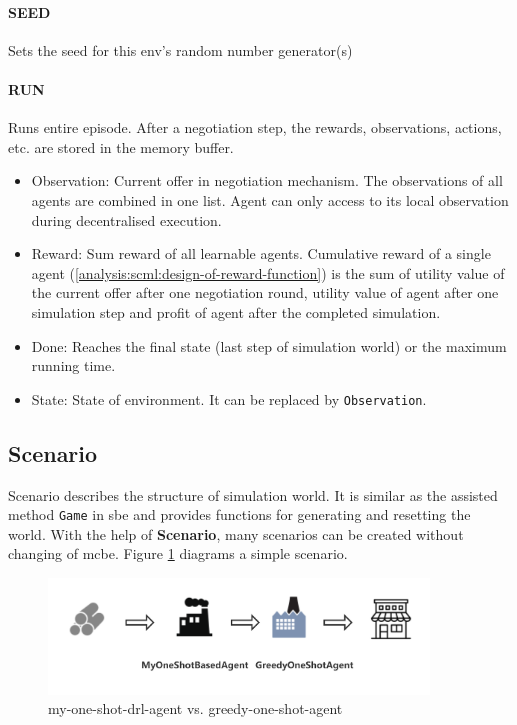 \paragraph{SEED} Sets the seed for this env’s random number generator(s)
\paragraph{RUN} Runs entire episode. After a negotiation step, the rewards, observations, actions, etc. are stored in the memory buffer. 
\begin{itemize}
	\item Observation: Current offer in negotiation mechanism. The observations of all agents are combined in one list. Agent can only access to its local observation during decentralised execution.
	\item Reward: Sum reward of all learnable agents. Cumulative reward of a single agent (\ref{analysis:scml:design-of-reward-function}) is the sum of utility value of the current offer after one negotiation round, utility value of agent after one simulation step and profit of agent after the completed simulation.
	\item Done: Reaches the final state (last step of simulation world) or the maximum running time.
	\item State: State of environment. It can be replaced by \texttt{Observation}.
\end{itemize}

\subsection{Scenario} \label{scenario}
Scenario describes the structure of simulation world. It is similar as the assisted method \texttt{Game} in \gls{sbe} and provides functions for generating and resetting the world. With the help of \textbf{Scenario}, many scenarios can be created without changing of \gls{mcbe}. Figure \ref{fig:supply-chain-scenario-1} diagrams a simple scenario.

\begin{figure}[htbp]
\centering
\includegraphics[width=0.9\textwidth]{./images/supply-chain-scenario-1.png}
\caption{\gls{my-one-shot-drl-agent} vs. \gls{greedy-one-shot-agent}}
\label{fig:supply-chain-scenario-1}
\end{figure}

